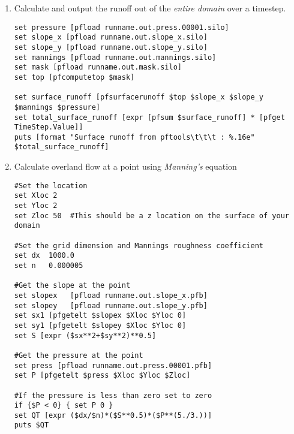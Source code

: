 \begin{enumerate}
\item Calculate and output the runoff out of the \emph{entire domain} over a timestep.
\begin{display}\begin{verbatim}
set pressure [pfload runname.out.press.00001.silo]
set slope_x [pfload runname.out.slope_x.silo]
set slope_y [pfload runname.out.slope_y.silo]
set mannings [pfload runname.out.mannings.silo]
set mask [pfload runname.out.mask.silo]
set top [pfcomputetop $mask]

set surface_runoff [pfsurfacerunoff $top $slope_x $slope_y $mannings $pressure]
set total_surface_runoff [expr [pfsum $surface_runoff] * [pfget TimeStep.Value]]
puts [format "Surface runoff from pftools\t\t\t : %.16e" $total_surface_runoff]
\end{verbatim}\end{display}

\item Calculate overland flow at a point using \emph{Manning's} equation
\begin{display}\begin{verbatim}
#Set the location
set Xloc 2
set Yloc 2
set Zloc 50  #This should be a z location on the surface of your domain

#Set the grid dimension and Mannings roughness coefficient
set dx  1000.0
set n   0.000005

#Get the slope at the point
set slopex   [pfload runname.out.slope_x.pfb]
set slopey   [pfload runname.out.slope_y.pfb]
set sx1 [pfgetelt $slopex $Xloc $Yloc 0]
set sy1 [pfgetelt $slopey $Xloc $Yloc 0]
set S [expr ($sx**2+$sy**2)**0.5]

#Get the pressure at the point
set press [pfload runname.out.press.00001.pfb]
set P [pfgetelt $press $Xloc $Yloc $Zloc]

#If the pressure is less than zero set to zero
if {$P < 0} { set P 0 }
set QT [expr ($dx/$n)*($S**0.5)*($P**(5./3.))]
puts $QT
\end{verbatim}\end{display}

\end{enumerate}

